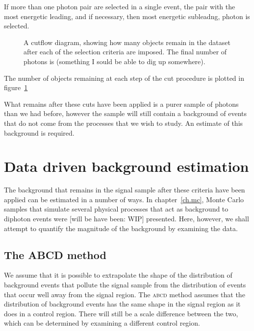 If more than one photon pair are selected in a single event, the pair with the most energetic leading, and if necessary, then most energetic subleadng, photon is selected.

\begin{figure}[htp]
\begin{minipage}[b]{.69\textwidth}
\begin{infilsf} \tiny

\end{infilsf}
\end{minipage}\hfill\begin{minipage}[b]{.3\textwidth}
\caption{A cutflow diagram, showing how many objects remain in the dataset after each of the selection criteria are imposed. The final number of photons is (something I sould be able to dig up somewhere).
\label{cutflow}}
\end{minipage}
\end{figure}

The number of objects remaining at each step of the cut procedure is plotted in figure~\ref{cutflow}

What remains after these cuts have been applied is a purer sample of photons than we had before, however the sample will still contain a background of events that do not come from the processes that we wish to study. An estimate of this background is required.

\section{Data driven background estimation}
The background that remains in the signal sample after these criteria have been applied can be estimated in a number of ways. In chapter~\ref{ch.mc}, Monte Carlo samples that simulate several physical processes that act as background to diphoton events were [will be have been: WIP] presented. Here, however, we shall attempt to quantify the magnitude of the background by examining the data.

\subsection{The ABCD method}
We assume that it is possible to extrapolate the shape of the distribution of background events that pollute the signal sample from the distribution of events that occur well away from the signal region. The \textsc{abcd} method assumes that the distribution of background events has the same shape in the signal region as it does in a control region. There will still be a scale difference between the two, which can be determined by examining a different control region.

